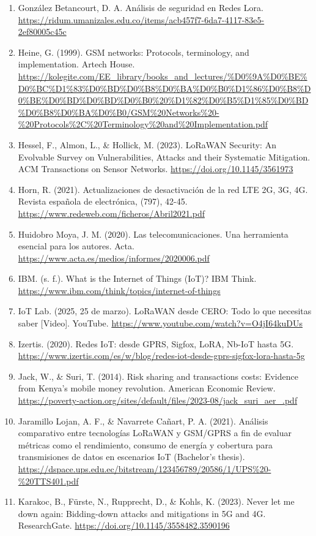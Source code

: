 \documentclass[12pt,a4paper]{article}
\begin{document}
\begin{enumerate}
    \item González Betancourt, D. A. Análisis de seguridad en Redes Lora. \url{https://ridum.umanizales.edu.co/items/acb457f7-6da7-4117-83e5-2ef80005c45c}
    \item Heine, G. (1999). GSM networks: Protocols, terminology, and implementation. Artech House. \url{https://kolegite.com/EE_library/books_and_lectures/%D0%9A%D0%BE%D0%BC%D1%83%D0%BD%D0%B8%D0%BA%D0%B0%D1%86%D0%B8%D0%BE%D0%BD%D0%BD%D0%B0%20%D1%82%D0%B5%D1%85%D0%BD%D0%B8%D0%BA%D0%B0/GSM%20Networks%20-%20Protocols%2C%20Terminology%20and%20Implementation.pdf}
    \item Hessel, F., Almon, L., \& Hollick, M. (2023). LoRaWAN Security: An Evolvable Survey on Vulnerabilities, Attacks and their Systematic Mitigation. ACM Transactions on Sensor Networks. \url{https://doi.org/10.1145/3561973}
    \item Horn, R. (2021). Actualizaciones de desactivación de la red LTE 2G, 3G, 4G. Revista española de electrónica, (797), 42-45. \url{https://www.redeweb.com/ficheros/Abril2021.pdf}
    \item Huidobro Moya, J. M. (2020). Las telecomunicaciones. Una herramienta esencial para los autores. Acta. \url{https://www.acta.es/medios/informes/2020006.pdf}
    \item IBM. (s. f.). What is the Internet of Things (IoT)? IBM Think. \url{https://www.ibm.com/think/topics/internet-of-things}
    \item IoT Lab. (2025, 25 de marzo). LoRaWAN desde CERO: Todo lo que necesitas saber [Video]. YouTube. \url{https://www.youtube.com/watch?v=O4jI64kuDUs}
    \item Izertis. (2020). Redes IoT: desde GPRS, Sigfox, LoRA, Nb-IoT hasta 5G. \url{https://www.izertis.com/es/w/blog/redes-iot-desde-gprs-sigfox-lora-hasta-5g}
    \item Jack, W., \& Suri, T. (2014). Risk sharing and transactions costs: Evidence from Kenya's mobile money revolution. American Economic Review. \url{https://poverty-action.org/sites/default/files/2023-08/jack_suri_aer_.pdf}
    \item Jaramillo Lojan, A. F., \& Navarrete Cañart, P. A. (2021). Análisis comparativo entre tecnologías LoRaWAN y GSM/GPRS a fin de evaluar métricas como el rendimiento, consumo de energía y cobertura para transmisiones de datos en escenarios IoT (Bachelor's thesis). \url{https://dspace.ups.edu.ec/bitstream/123456789/20586/1/UPS%20-%20TTS401.pdf}
    \item Karakoc, B., Fürste, N., Rupprecht, D., \& Kohls, K. (2023). Never let me down again: Bidding-down attacks and mitigations in 5G and 4G. ResearchGate. \url{https://doi.org/10.1145/3558482.3590196}

\end{enumerate}
\end{document}
